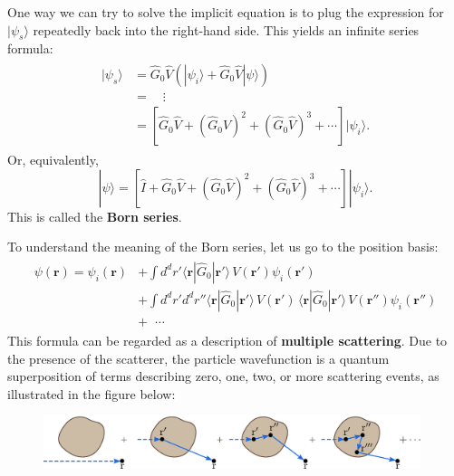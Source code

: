 \documentclass[pra,12pt]{revtex4}
\begin{document}
One way we can try to solve the implicit equation is to plug the
expression for $|\psi_s\rangle$ repeatedly back into the right-hand
side.  This yields an infinite series formula:
\begin{align}
  \begin{aligned}|\psi_s\rangle &= \hat{G}_0 \hat{V} \left(|\psi_i\rangle + \hat{G}_0 \hat{V}|\psi\rangle\right) \\ &= \quad \vdots \\ &= \left[\hat{G}_0 \hat{V} + (\hat{G}_0 \hat{V})^2 + (\hat{G}_0 \hat{V})^3 + \cdots\right]|\psi_i\rangle.\end{aligned}
\end{align}
Or, equivalently,
\begin{equation}
  |\psi\rangle = \left[\hat{I} + \hat{G}_0 \hat{V} + (\hat{G}_0 \hat{V})^2 + (\hat{G}_0 \hat{V})^3 + \cdots\right]|\psi_i\rangle.
\end{equation}
This is called the \textbf{Born series}.

To understand the meaning of the Born series, let us go to the
position basis:
\begin{align}
  \begin{aligned}\psi(\mathbf{r}) = \psi_i(\mathbf{r}) &+ \int d^dr' \langle \mathbf{r} | \hat{G}_0 |\mathbf{r}'\rangle\, V(\mathbf{r}') \psi_i(\mathbf{r}') \\ &+ \int d^dr' d^dr'' \langle \mathbf{r} | \hat{G}_0 |\mathbf{r}'\rangle\, V(\mathbf{r}') \, \langle \mathbf{r} | \hat{G}_0 |\mathbf{r}'\rangle \, V(\mathbf{r}'') \psi_i(\mathbf{r}'') \\ &+ \;\;\cdots\end{aligned}
\end{align}
This formula can be regarded as a description of \textbf{multiple
  scattering}.  Due to the presence of the scatterer, the particle
wavefunction is a quantum superposition of terms describing zero, one,
two, or more scattering events, as illustrated in the figure below:

\begin{figure}[h!]
  \centering\includegraphics[width=0.98\textwidth]{bornseries}
\end{figure}
\end{document}
